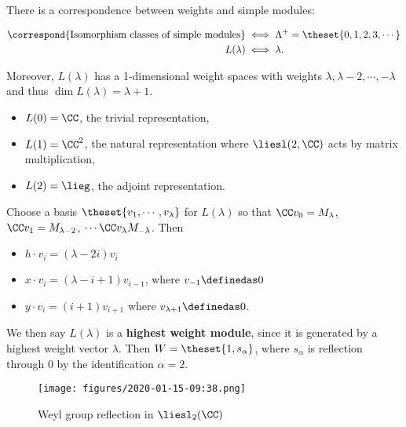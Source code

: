 There is a correspondence between weights and simple modules:

\begin{align*}
\correspond{\text{Isomorphism classes of simple modules}} &\iff \Lambda^+ = \theset{0,1,2,3,\cdots} \\
L(\lambda) &\iff \lambda
.\end{align*}

Moreover, \(L(\lambda)\) has a 1-dimensional weight spaces with weights
\(\lambda, \lambda - 2, \cdots, -\lambda\) and thus
\(\dim L(\lambda) = \lambda + 1\).

\begin{example}[?]

\envlist

\begin{itemize}
\tightlist
\item
  \(L(0) = \CC\), the trivial representation,
\item
  \(L(1) = \CC^2\), the natural representation where \(\liesl(2, \CC)\)
  acts by matrix multiplication,
\item
  \(L(2) = \lieg\), the adjoint representation.
\end{itemize}

\end{example}

Choose a basis \(\theset{v_1, \cdots, v_\lambda}\) for \(L(\lambda)\) so
that \(\CC v_0 = M_{\lambda}\), \(\CC v_1 = M_{\lambda - 2}\),
\(\cdots \CC v_{\lambda} M_{-\lambda}\). Then

\begin{itemize}
\tightlist
\item
  \(h\cdot v_i = (\lambda - 2i) v_i\)
\item
  \(x \cdot v_i = (\lambda - i + 1) v_{i-1}\), where
  \(v_{-1} \definedas 0\)
\item
  \(y \cdot v_i = (i + 1)v_{i+1}\) where
  \(v_{\lambda + 1} \definedas 0\).
\end{itemize}

We then say \(L(\lambda)\) is a \textbf{highest weight module}, since it
is generated by a highest weight vector \(\lambda\). Then
\(W = \theset{1, s_\alpha}\), where \(s_\alpha\) is reflection through 0
by the identification \(\alpha = 2\).

\begin{figure}
\centering
\texttt{[image: figures/2020-01-15-09:38.png]}
\caption{Weyl group reflection in \(\liesl_2(\CC)\)}
\end{figure}


